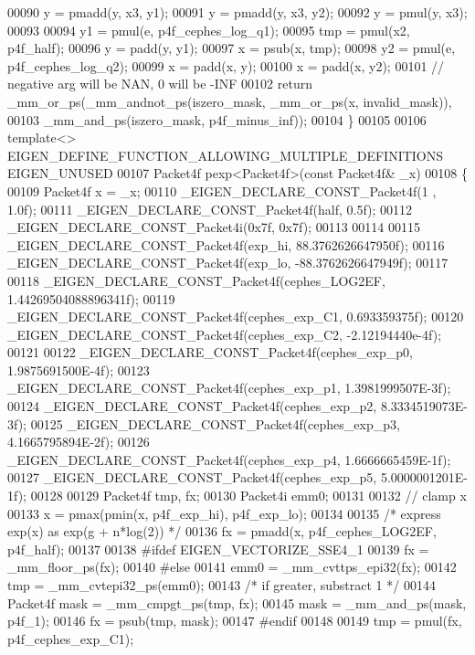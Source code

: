 \begin{DoxyCode}
00090   y = pmadd(y, x3, y1);
00091   y = pmadd(y, x3, y2);
00092   y = pmul(y, x3);
00093 
00094   y1 = pmul(e, p4f\_cephes\_log\_q1);
00095   tmp = pmul(x2, p4f\_half);
00096   y = padd(y, y1);
00097   x = psub(x, tmp);
00098   y2 = pmul(e, p4f\_cephes\_log\_q2);
00099   x = padd(x, y);
00100   x = padd(x, y2);
00101   \textcolor{comment}{// negative arg will be NAN, 0 will be -INF}
00102   \textcolor{keywordflow}{return} \_mm\_or\_ps(\_mm\_andnot\_ps(iszero\_mask, \_mm\_or\_ps(x, invalid\_mask)),
00103                    \_mm\_and\_ps(iszero\_mask, p4f\_minus\_inf));
00104 \}
00105 
00106 \textcolor{keyword}{template}<> EIGEN\_DEFINE\_FUNCTION\_ALLOWING\_MULTIPLE\_DEFINITIONS EIGEN\_UNUSED
00107 Packet4f pexp<Packet4f>(\textcolor{keyword}{const} Packet4f& \_x)
00108 \{
00109   Packet4f x = \_x;
00110   \_EIGEN\_DECLARE\_CONST\_Packet4f(1 , 1.0f);
00111   \_EIGEN\_DECLARE\_CONST\_Packet4f(half, 0.5f);
00112   \_EIGEN\_DECLARE\_CONST\_Packet4i(0x7f, 0x7f);
00113 
00114 
00115   \_EIGEN\_DECLARE\_CONST\_Packet4f(exp\_hi,  88.3762626647950f);
00116   \_EIGEN\_DECLARE\_CONST\_Packet4f(exp\_lo, -88.3762626647949f);
00117 
00118   \_EIGEN\_DECLARE\_CONST\_Packet4f(cephes\_LOG2EF, 1.44269504088896341f);
00119   \_EIGEN\_DECLARE\_CONST\_Packet4f(cephes\_exp\_C1, 0.693359375f);
00120   \_EIGEN\_DECLARE\_CONST\_Packet4f(cephes\_exp\_C2, -2.12194440e-4f);
00121 
00122   \_EIGEN\_DECLARE\_CONST\_Packet4f(cephes\_exp\_p0, 1.9875691500E-4f);
00123   \_EIGEN\_DECLARE\_CONST\_Packet4f(cephes\_exp\_p1, 1.3981999507E-3f);
00124   \_EIGEN\_DECLARE\_CONST\_Packet4f(cephes\_exp\_p2, 8.3334519073E-3f);
00125   \_EIGEN\_DECLARE\_CONST\_Packet4f(cephes\_exp\_p3, 4.1665795894E-2f);
00126   \_EIGEN\_DECLARE\_CONST\_Packet4f(cephes\_exp\_p4, 1.6666665459E-1f);
00127   \_EIGEN\_DECLARE\_CONST\_Packet4f(cephes\_exp\_p5, 5.0000001201E-1f);
00128 
00129   Packet4f tmp, fx;
00130   Packet4i emm0;
00131 
00132   \textcolor{comment}{// clamp x}
00133   x = pmax(pmin(x, p4f\_exp\_hi), p4f\_exp\_lo);
00134 
00135   \textcolor{comment}{/* express exp(x) as exp(g + n*log(2)) */}
00136   fx = pmadd(x, p4f\_cephes\_LOG2EF, p4f\_half);
00137 
00138 \textcolor{preprocessor}{#ifdef EIGEN\_VECTORIZE\_SSE4\_1}
00139   fx = \_mm\_floor\_ps(fx);
00140 \textcolor{preprocessor}{#else}
00141   emm0 = \_mm\_cvttps\_epi32(fx);
00142   tmp  = \_mm\_cvtepi32\_ps(emm0);
00143   \textcolor{comment}{/* if greater, substract 1 */}
00144   Packet4f mask = \_mm\_cmpgt\_ps(tmp, fx);
00145   mask = \_mm\_and\_ps(mask, p4f\_1);
00146   fx = psub(tmp, mask);
00147 \textcolor{preprocessor}{#endif}
00148 
00149   tmp = pmul(fx, p4f\_cephes\_exp\_C1);

\end{DoxyCode}
